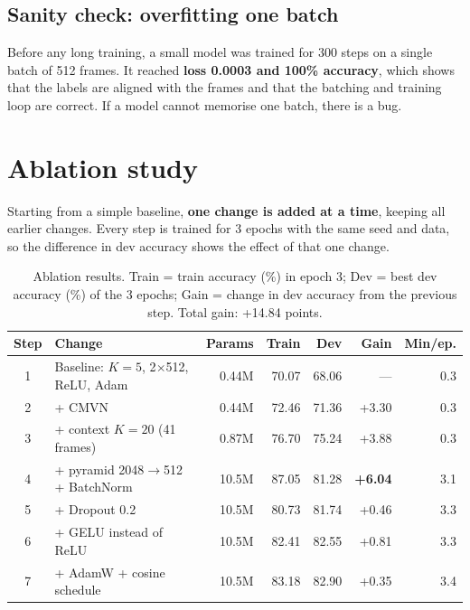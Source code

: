 \documentclass[11pt,a4paper]{article}
\begin{document}
\subsection{Sanity check: overfitting one batch}\label{sec:sanity}
Before any long training, a small model was trained for 300 steps on a single batch of 512 frames. It
reached \textbf{loss 0.0003 and 100\% accuracy}, which shows that the labels are aligned with the frames
and that the batching and training loop are correct. If a model cannot memorise one batch, there is a bug.

\section{Ablation study}\label{sec:ablation}

Starting from a simple baseline, \textbf{one change is added at a time}, keeping all earlier changes. Every
step is trained for 3 epochs with the same seed and data, so the difference in dev accuracy shows the
effect of that one change.

\begin{table}[H]
\centering
\small
\setlength{\tabcolsep}{4pt}
\begin{tabular}{clrrrrr}
\toprule
Step & Change & Params & Train & Dev & Gain & Min/ep. \\
\midrule
1 & Baseline: $K{=}5$, 2$\times$512, ReLU, Adam & 0.44M & 70.07 & 68.06 & ---  & 0.3 \\
2 & + CMVN                                  & 0.44M & 72.46 & 71.36 & +3.30 & 0.3 \\
3 & + context $K{=}20$ (41 frames)          & 0.87M & 76.70 & 75.24 & +3.88 & 0.3 \\
4 & + pyramid 2048$\rightarrow$512 + BatchNorm & 10.5M & 87.05 & 81.28 & \textbf{+6.04} & 3.1 \\
5 & + Dropout 0.2                           & 10.5M & 80.73 & 81.74 & +0.46 & 3.3 \\
6 & + GELU instead of ReLU                  & 10.5M & 82.41 & 82.55 & +0.81 & 3.3 \\
7 & + AdamW + cosine schedule               & 10.5M & 83.18 & 82.90 & +0.35 & 3.4 \\
\bottomrule
\end{tabular}
\caption{Ablation results. Train = train accuracy (\%) in epoch 3; Dev = best dev accuracy (\%) of the 3
epochs; Gain = change in dev accuracy from the previous step. Total gain: +14.84 points.}
\label{tab:ablation}
\end{table}
\end{document}
